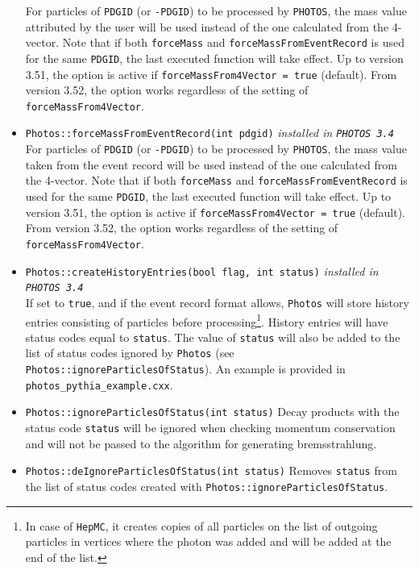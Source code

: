 \documentclass[]{Photos_interface_design}
\begin{document}
\begin{itemize}
        For particles of {\tt PDGID} (or {\tt -PDGID})  to be processed by {\tt PHOTOS},
        the mass value attributed  by the user will be used instead of the one calculated
        from the 4-vector. Note that if both {\tt forceMass} and {\tt forceMassFromEventRecord} is
        used for the same {\tt PDGID}, the last executed function will take effect.
        Up to version 3.51, the option is active if {\tt forceMassFrom4Vector = true} (default).
        From version 3.52, the option works regardless of the setting of {\tt forceMassFrom4Vector}.
  \item {\tt Photos::forceMassFromEventRecord(int pdgid)} {\it  installed in {\tt PHOTOS 3.4}} \\
        For particles of {\tt PDGID} (or {\tt -PDGID}) to be  processed by {\tt PHOTOS},
        the mass value taken from the event record will be used instead of the one
        calculated from the 4-vector. Note that if both {\tt forceMass} and {\tt forceMassFromEventRecord} is
        used for the same {\tt PDGID}, the last executed function will take effect.
        Up to version 3.51, the option is active if {\tt forceMassFrom4Vector = true} (default).
        From version 3.52, the option works regardless of the setting of {\tt forceMassFrom4Vector}.
  \item {\tt Photos::createHistoryEntries(bool flag, int status)} {\it  installed in {\tt PHOTOS 3.4}} \\
        If set to {\tt true}, and if the event record format allows,
        {\tt Photos} will store history entries consisting of particles
        before processing\footnote{In case of {\tt HepMC}, it creates copies
        of all particles on the list of outgoing particles in vertices where
        the photon was added and will be added at the end of the list.}.
        History entries will have status codes equal to {\tt status}.
        The value of {\tt status} will also be added to the list of status
        codes ignored by {\tt Photos} (see {\tt Photos::ignoreParticlesOfStatus}).
        An example is provided in  {\tt photos\_pythia\_example.cxx}.
  \item {\tt Photos::ignoreParticlesOfStatus(int status)} Decay products with the status code
        {\tt status} will be ignored when checking momentum conservation and will not be passed
        to the algorithm for generating bremsstrahlung.
  \item {\tt Photos::deIgnoreParticlesOfStatus(int status)} Removes {\tt status} from
        the list of status codes created with {\tt Photos::ignoreParticlesOfStatus}.

\end{itemize}
\end{document}
